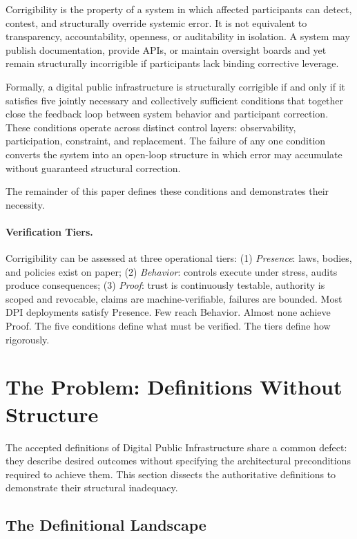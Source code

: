 \documentclass{article}
\begin{document}
Corrigibility is the property of a system in which affected participants can detect, contest, and structurally override systemic error. It is not equivalent to transparency, accountability, openness, or auditability in isolation. A system may publish documentation, provide APIs, or maintain oversight boards and yet remain structurally incorrigible if participants lack binding corrective leverage.

Formally, a digital public infrastructure is structurally corrigible if and only if it satisfies five jointly necessary and collectively sufficient conditions that together close the feedback loop between system behavior and participant correction. These conditions operate across distinct control layers: observability, participation, constraint, and replacement. The failure of any one condition converts the system into an open-loop structure in which error may accumulate without guaranteed structural correction.

The remainder of this paper defines these conditions and demonstrates their necessity.

\paragraph{Verification Tiers.} Corrigibility can be assessed at three operational tiers: (1) \textit{Presence}: laws, bodies, and policies exist on paper; (2) \textit{Behavior}: controls execute under stress, audits produce consequences; (3) \textit{Proof}: trust is continuously testable, authority is scoped and revocable, claims are machine-verifiable, failures are bounded. Most DPI deployments satisfy Presence. Few reach Behavior. Almost none achieve Proof. The five conditions define what must be verified. The tiers define how rigorously.

\section{The Problem: Definitions Without Structure}
\label{sec:problem}

The accepted definitions of Digital Public Infrastructure share a common defect: they describe desired outcomes without specifying the architectural preconditions required to achieve them. This section dissects the authoritative definitions to demonstrate their structural inadequacy.

\subsection{The Definitional Landscape}
\end{document}
